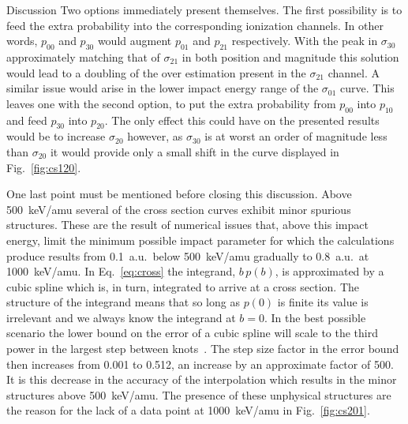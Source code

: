 \documentclass[aps, pra, reprint, groupedaddress, amsfonts, longbibliography,
               amsmath, amssymb, showpacs, nofootinbib]{revtex4-1}
\begin{document}
\begin{section}{Discussion \label{sec:disc}}
   Two options immediately present themselves. The first possibility is to feed the extra probability
   into the corresponding ionization channels. In other words, $p_{00}$ and $p_{30}$ would augment
   $p_{01}$ and $p_{21}$ respectively. With the peak in $\sigma_{30}$ approximately matching that of
   $\sigma_{21}$ in both position and magnitude this solution would lead to a doubling of the over
   estimation present in the $\sigma_{21}$ channel. A similar issue would arise in the lower impact
   energy range of the $\sigma_{01}$ curve. This leaves one with the second option, to put the extra
   probability from $p_{00}$ into $p_{10}$ and feed $p_{30}$ into $p_{20}$. The only effect this could
   have on the presented results would be to increase $\sigma_{20}$ however, as $\sigma_{30}$ is at
   worst an order of magnitude less than $\sigma_{20}$ it would provide only a small shift in the curve
   displayed in Fig.~\ref{fig:cs120}.

   One last point must be mentioned before closing this discussion. Above 500~keV/amu several of the
   cross section curves exhibit minor spurious structures. These are the result of numerical issues
   that, above this impact energy, limit the minimum possible impact parameter for which the
   calculations produce results from 0.1~a.u.\ below 500~keV/amu gradually to 0.8~a.u.\ at 1000~keV/amu.
   In Eq.~\eqref{eq:cross} the integrand, $b \, p(b)$, is approximated by a cubic spline which is, in
   turn, integrated to arrive at a cross section. The structure of the integrand means that so long as
   $p(0)$ is finite its value is irrelevant and we always know the integrand at $b = 0$. In the best
   possible scenario the lower bound on the error of a cubic spline will scale to the third power in the
   largest step between knots~\cite{spline-err}. The step size factor in the error bound then increases
   from 0.001 to 0.512, an increase by an approximate factor of 500. It is this decrease in the accuracy
   of the interpolation which results in the minor structures above 500~keV/amu. The presence of these
   unphysical structures are the reason for the lack of a data point at 1000~keV/amu in
   Fig.~\ref{fig:cs201}.

\end{section}
\end{document}
